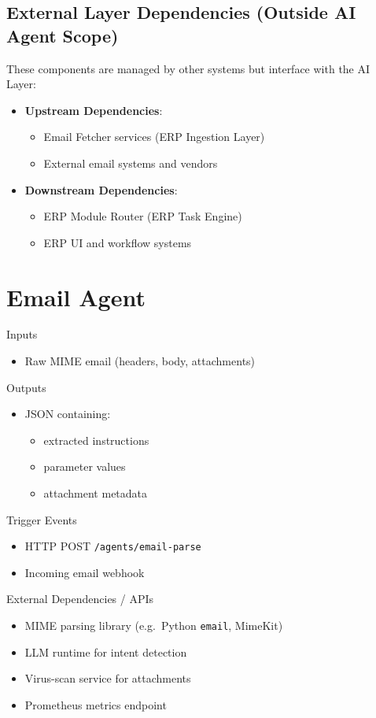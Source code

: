\documentclass[12pt]{report}
\begin{document}
\subsection{External Layer Dependencies (Outside AI Agent Scope)}
These components are managed by other systems but interface with the AI Layer:
\begin{itemize}
  \item \textbf{Upstream Dependencies}:
    \begin{itemize}
      \item Email Fetcher services (ERP Ingestion Layer)
      \item External email systems and vendors
    \end{itemize}
  \item \textbf{Downstream Dependencies}:
    \begin{itemize}
      \item ERP Module Router (ERP Task Engine)
      \item ERP UI and workflow systems
    \end{itemize}
\end{itemize}

\section{Email Agent}
\begin{description}
  \item Inputs 
    \begin{itemize}
      \item Raw MIME email (headers, body, attachments)
    \end{itemize}
  \item Outputs
    \begin{itemize}
      \item JSON containing:
      \begin{itemize}
        \item extracted instructions  
        \item parameter values  
        \item attachment metadata  
      \end{itemize}
    \end{itemize}
  \item Trigger Events 
    \begin{itemize}
      \item HTTP POST \texttt{/agents/email-parse}
      \item Incoming email webhook  
    \end{itemize}
  \item External Dependencies / APIs
    \begin{itemize}
      \item MIME parsing library (e.g.\ Python \texttt{email}, MimeKit)  
      \item LLM runtime for intent detection  
      \item Virus-scan service for attachments  
      \item Prometheus metrics endpoint  
    \end{itemize}
\end{description}
\end{document}
